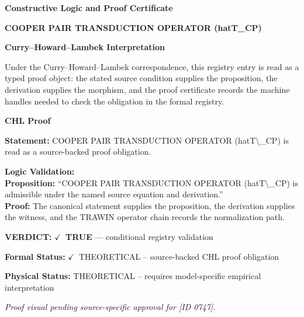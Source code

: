 \clearpage
\begingroup\tzpsupportsetup
\noindent\textbf{\fontsize{10.8pt}{12.8pt}\selectfont [ID 0747] Constructive Logic and Proof Certificate}\par
\noindent\textbf{\fontsize{10pt}{12pt}\selectfont COOPER PAIR TRANSDUCTION OPERATOR (hatT\_CP)}\par
\vspace{0.45em}
\begingroup
\footnotesize
\setlength{\parskip}{0.22em}
\setlength{\parindent}{0pt}
\noindent\textbf{Curry--Howard--Lambek Interpretation}\par
Under the Curry--Howard--Lambek correspondence, this registry entry is read as a typed proof
object: the stated source condition supplies the proposition, the derivation supplies the
morphism, and the proof certificate records the machine handles needed to check the obligation
in the formal registry.

\vspace{0.45em}
\noindent\textbf{CHL Proof}\par
\textbf{Statement:} COOPER PAIR TRANSDUCTION OPERATOR (hatT\textbackslash{}\_CP) is read as a source-backed proof obligation.

\textbf{Logic Validation:}\\
\textbf{Proposition:} ``COOPER PAIR TRANSDUCTION OPERATOR (hatT\textbackslash{}\_CP) is admissible under the named source equation and derivation.''\\
\textbf{Proof:} The canonical statement supplies the proposition, the derivation supplies the witness, and the TRAWIN operator chain records the normalization path.

\textbf{VERDICT:} \ensuremath{\checkmark}\ \textbf{TRUE} --- conditional registry validation

\textbf{Formal Status:} \ensuremath{\checkmark}\ THEORETICAL -- source-backed CHL proof obligation

\textbf{Physical Status:} THEORETICAL -- requires model-specific empirical interpretation
\par\vspace{0.45em}
\par
\vfill
\begingroup\footnotesize\itshape
Proof visual pending source-specific approval for [ID 0747].
\par\endgroup
\vfill
\endgroup
\endgroup
